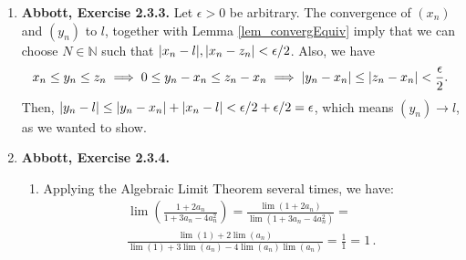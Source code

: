 \documentclass{article}
\newcounter{lemmaCounter}
\newenvironment{shortlemma}[1]{\refstepcounter{lemmaCounter}
\label{#1}\textbf{Lemma~\thelemmaCounter.}\em}
\DeclarePairedDelimiter\abs{\lvert}{\rvert}
\newcommand{\N}{\mathbb{N}}
\newcommand{\ra}{\rightarrow}
\newcommand{\exc}[2][Abbott]{\item \textbf{#1, Exercise #2.}}
\newcommand{\lep}[1][L]{#1et $\epsilon > 0$ be arbitrary}
\let\oldmax\max
\renewcommand{\max}[1]{\oldmax \left( #1 \right)}
\begin{document}
\begin{enumerate}
\begin{enumerate}
		\item Let $\epsilon > 0$ be arbitrary. Since $(x_n) \rightarrow 2$, we can choose a natural number $N_1$ such that $|x_n-2| < 2\epsilon$ for all $n \geq N_1$. We can also find a natural $N_2$ such that $\abs{2-x_n} < 1$, for all $n \geq N_2$, which implies $|x_n| > 1$. Let $N := \max{N_1, N_2}$. Then, for all $n \geq N$, we have \begin{equation*}
		      \abs[\Big]{\frac{1}{x_n}-\frac{1}{2}} = \abs[\Big]{\frac{2-x_n}{2x_n}} < \abs[\Big]{\frac{x_n-2}{2}} < \epsilon.
		\end{equation*}
	\end{enumerate}
	
	\begin{shortlemma}{lem_convergEquiv}
	    If $(x_n), (y_n) \rightarrow L$ for some real number $L$, then for every $\epsilon > 0$ there is some natural $N$ such that $\abs{x_n-y_n} < \epsilon$ for all $n \geq N$.
	\end{shortlemma}
	\begin{proof}
    \lep \space and use the fact that both the sequences converge to find $N_1, N_2 \in \N$ such that $\abs{x_n - L} < \epsilon/2$ for all $n \geq N_1$ and $\abs{y_m-L} < \epsilon/2$ for all $m \geq N_2$. Setting $N := \max{N_1, N_2}$ we have $\abs{x_n-L} < \epsilon/2$ $\abs{y_n-L} < \epsilon/2$ for all $n \geq N$. Summing the two inequalities, we get $\abs{x_n-L} + \abs{y_n-L} < \epsilon$, and we can use the triangle inequality to see that $\abs{x_n-y_n} \leq \abs{x_n-L} + \abs{y_n-L} < \epsilon$, as we wanted to show.
	\end{proof}
				      	              
	\exc{2.3.3}
	\lep. The convergence of $(x_n)$ and $(y_n)$ to $l$, together with Lemma \ref{lem_convergEquiv} imply that we can choose $N \in \N$ such that $\abs{x_n-l}, \abs{x_n-z_n} < \epsilon/2$. Also, we have 
	\begin{equation*}
	    x_n \leq y_n \leq z_n \implies 0 \leq y_n-x_n \leq z_n-x_n \implies 
	    \abs{y_n-x_n} \leq \abs{z_n-x_n} < \frac{\epsilon}{2}.
	\end{equation*} Then, $\abs{y_n-l} \leq \abs{y_n-x_n} + \abs{x_n-l} < \epsilon/2 + \epsilon/2 = \epsilon$, which means $(y_n) \ra l$, as we wanted to show.
	 
	\exc{2.3.4}
	\begin{enumerate}
		\item Applying the Algebraic Limit Theorem several times, we have: \begin{gather}
		      \nonumber \lim (\frac{1+2a_n}{1+3a_n-4a_{n}^2}) = \frac{\lim (1 + 2a_n)}{\lim (1 + 3a_n-4a_n^2)} = \\
		      \nonumber \frac{\lim (1) + 2\lim(a_n)}{\lim(1) + 3\lim(a_n) - 4 \lim(a_n) \lim(a_n)} = \frac{1}{1} = 1 \, .
		\end{gather}
							      		        

\end{enumerate}
\end{enumerate}
\end{document}
